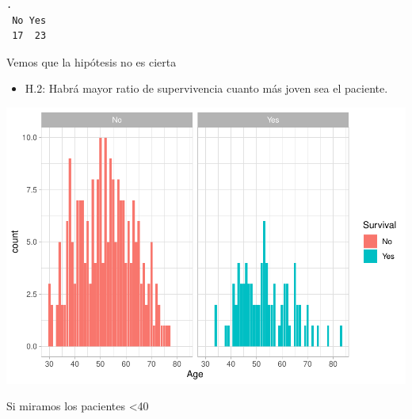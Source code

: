 \documentclass[
]{article}
\newenvironment{Shaded}{\begin{snugshade}}{\end{snugshade}}
\newcommand{\DataTypeTok}[1]{\textcolor[rgb]{0.13,0.29,0.53}{#1}}
\newcommand{\DecValTok}[1]{\textcolor[rgb]{0.00,0.00,0.81}{#1}}
\newcommand{\KeywordTok}[1]{\textcolor[rgb]{0.13,0.29,0.53}{\textbf{#1}}}
\newcommand{\NormalTok}[1]{#1}
\newcommand{\OperatorTok}[1]{\textcolor[rgb]{0.81,0.36,0.00}{\textbf{#1}}}
\newcommand{\StringTok}[1]{\textcolor[rgb]{0.31,0.60,0.02}{#1}}
\providecommand{\tightlist}{%
  \setlength{\itemsep}{0pt}\setlength{\parskip}{0pt}}
\begin{document}
\begin{verbatim}
.
 No Yes 
 17  23 
\end{verbatim}

Vemos que la hipótesis no es cierta

\begin{itemize}
\tightlist
\item
  H.2: Habrá mayor ratio de supervivencia cuanto más joven sea el
  paciente.
\end{itemize}

\begin{Shaded}
\end{Shaded}

\begin{center}\includegraphics{EDA2_files/figure-latex/unnamed-chunk-33-1} \end{center}

Si miramos los pacientes \textless40

\begin{Shaded}
\end{Shaded}
\end{document}
